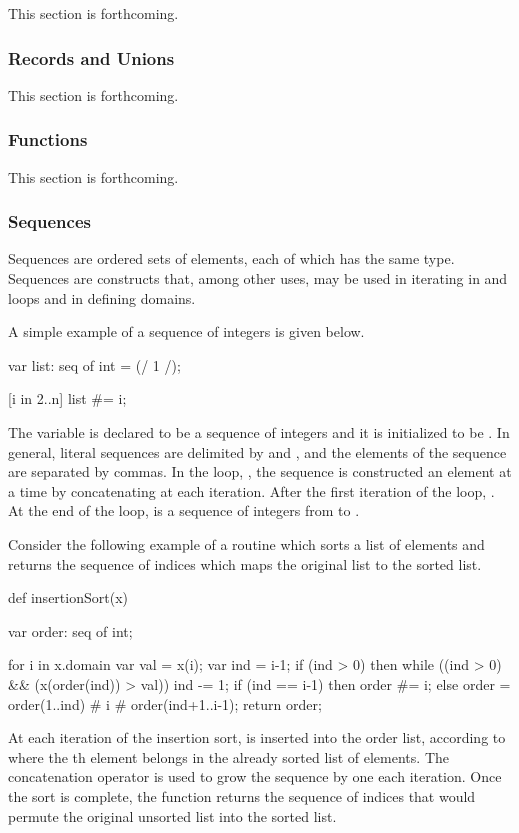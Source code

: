 This section is forthcoming.

\subsubsection{Records and Unions}
\label{Intro_Records_and_Unions}

This section is forthcoming.

\subsubsection{Functions}
\label{Intro_Functions}

This section is forthcoming.

\subsubsection{Sequences}
\label{Intro_Sequences}

Sequences are ordered sets of elements, each of which has the same type.
Sequences are constructs that, among other uses, may be used in iterating in 
and  loops and in defining domains.  

A simple example of a sequence of integers is given below.
\begin{chapel}
var list: seq of int = (/ 1 /);

[i in 2..n] list #= i;
\end{chapel}
The variable  is declared to be a sequence of integers and it is 
initialized to be . In general, literal sequences are delimited by 
\chpl{(/} and \chpl{/)}, and the elements of the sequence are separated by commas.
In the loop, \chpl{[i in 2..n]}, the sequence  is constructed an element 
at a time by concatenating  at each iteration. After the first iteration 
of the loop, . At the end of the loop,
 is a sequence of integers from  to .

Consider the following example of a routine which sorts a list 
of elements and returns the sequence of indices which maps the original
list to the sorted list.
\begin{example}
\begin{chapel}
def insertionSort(x) {
  var order: seq of int;

  for i in x.domain {
    var val = x(i);
    var ind = i-1;
    if (ind > 0) then
      while ((ind > 0) && (x(order(ind)) > val)) {
        ind -= 1;
      }
    if (ind == i-1) then
      order #= i;
    else
      order = order(1..ind) # i # order(ind+1..i-1);
  }
  return order;
}
\end{chapel}
\end{example}
At each iteration of the insertion sort,  is inserted into the
order list, according to where the th element belongs in
the already sorted list of  elements.  The concatenation operator 
\chpl{#} is used to grow the sequence by one each iteration.  Once the sort is
complete, the function returns the sequence of indices that would permute
the original unsorted list into the sorted list.

